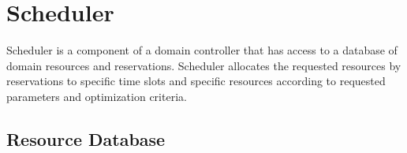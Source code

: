 \newcommand{\SchedulerInputCode}[1]{
\CodeStyle{
  Object, Enum, Integer, String, Boolean, List, Set,  
  IP-Address, URL, URN, 
  extends, of, or, *
}
\vspace{2mm}

}

\chapter{Scheduler}

Scheduler is a component of a domain controller that has access to a database 
of domain resources and reservations. Scheduler allocates the requested 
resources by reservations to specific time slots and specific resources 
according to requested parameters and optimization criteria.

\section{Resource Database}

